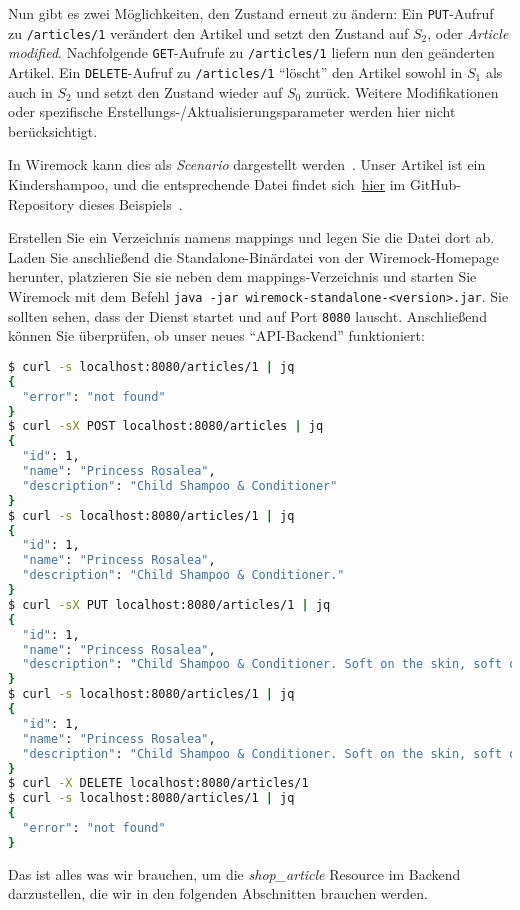\documentclass[paper=a4,11pt,numbers=noenddot]{article}
\begin{document}
Nun gibt es zwei Möglichkeiten, den Zustand erneut zu ändern: Ein \verb'PUT'-Aufruf zu \verb'/articles/1' verändert den Artikel und setzt den Zustand auf $S_2$, oder \emph{Article modified}. Nachfolgende \verb'GET'-Aufrufe zu \verb'/articles/1' liefern nun den geänderten Artikel. Ein \verb'DELETE'-Aufruf zu \verb'/articles/1' ``löscht'' den Artikel sowohl in $S_1$ als auch in $S_2$ und setzt den Zustand wieder auf $S_0$ zurück. Weitere Modifikationen oder spezifische Erstellungs-/Aktualisierungsparameter werden hier nicht berücksichtigt.

In Wiremock kann dies als \emph{Scenario} dargestellt werden~\autocite{noauthor_wiremock_stateful_behavior_2025}. Unser Artikel ist ein Kindershampoo, und die entsprechende Datei findet sich~\href{https://github.com/ecky-l/terraform-provider-example/blob/main/src/wiremock/mappings/shampoo.json}{hier} im GitHub-Repository dieses Beispiels~\autocite{ecky-l_terraform-provider-example_nodate}.

Erstellen Sie ein Verzeichnis namens mappings und legen Sie die Datei dort ab. Laden Sie anschließend die Standalone-Binärdatei von der Wiremock-Homepage herunter, platzieren Sie sie neben dem mappings-Verzeichnis und starten Sie Wiremock mit dem Befehl \verb'java -jar wiremock-standalone-<version>.jar'. Sie sollten sehen, dass der Dienst startet und auf Port \verb'8080' lauscht. Anschließend können Sie überprüfen, ob unser neues ``API-Backend'' funktioniert:

\begin{lstlisting}[language=bash]
$ curl -s localhost:8080/articles/1 | jq
{
  "error": "not found"
}
$ curl -sX POST localhost:8080/articles | jq
{
  "id": 1,
  "name": "Princess Rosalea",
  "description": "Child Shampoo & Conditioner"
}
$ curl -s localhost:8080/articles/1 | jq
{
  "id": 1,
  "name": "Princess Rosalea",
  "description": "Child Shampoo & Conditioner."
}
$ curl -sX PUT localhost:8080/articles/1 | jq
{
  "id": 1,
  "name": "Princess Rosalea",
  "description": "Child Shampoo & Conditioner. Soft on the skin, soft on the environment."
}
$ curl -s localhost:8080/articles/1 | jq
{
  "id": 1,
  "name": "Princess Rosalea",
  "description": "Child Shampoo & Conditioner. Soft on the skin, soft on the environment."
}
$ curl -X DELETE localhost:8080/articles/1
$ curl -s localhost:8080/articles/1 | jq
{
  "error": "not found"
}
\end{lstlisting}

Das ist alles was wir brauchen, um die \emph{shop\_article} Resource im Backend darzustellen, die wir in den folgenden Abschnitten brauchen werden.
\end{document}
